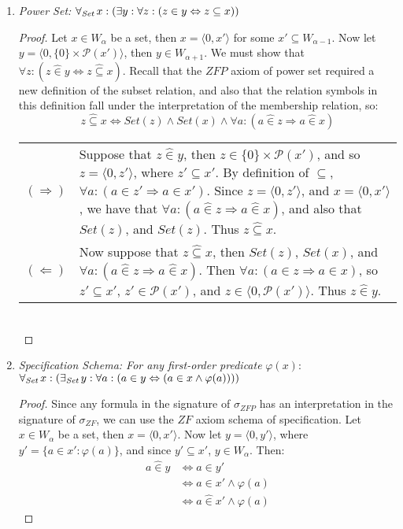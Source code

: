 \documentclass[11pt]{report}
\newcommand{\all}[1]{\forall_{\mathit{#1}}\hspace{0.5mm}}
\newcommand{\ex}[1]{\exists_{\mathit{#1}}\hspace{0.5mm}}
\newcommand{\pair}[2]{\langle #1,#2 \rangle}
\newcommand{\zin}{\mathrel{\widehat{\in}}}
\theoremstyle{definition}
\theoremstyle{theorem}
\theoremstyle{lemma}
\begin{document}
\begin{enumerate}[resume=axiomlist, label=\Roman*.]
\item \textit{Power Set:} $\all{Set}x:(\exists y:\forall z:(z\in y \Leftrightarrow z\subseteq x))$
\begin{proof}
  Let $x\in W_\alpha$ be a set, then $x=\pair{0}{x'}$ for some $x'\subseteq W_{\alpha-1}$.
  Now let $y=\pair{0}{\{0\}\times\mathcal{P}(x')}$, then $y\in W_{\alpha+1}$.
  We must show that $\forall z: (z\zin y \Leftrightarrow z\mathrel{\widehat\subseteq} x)$.
  Recall that the $\mathit{ZFP}$ axiom of power set required a new definition of the subset relation, and also that the relation symbols in this definition fall under the interpretation of the membership relation, so:
    $$z\mathrel{\widehat\subseteq} x \iff \mathit{Set}(z)\wedge\mathit{Set}(x)
                        \wedge \forall a: (a\zin z \Rightarrow a\zin x)$$
\begin{tabular}{p{7mm} p{10.6cm}}
  $(\Rightarrow)$\rule{0pt}{5mm} &
  Suppose that $z\zin y$, then $z\in\{0\}\times\mathcal{P}(x')$, and so $z=\pair{0}{z'}$, where $z'\subseteq x'$.
  By definition of $\subseteq$, $\forall a:(a\in z' \Rightarrow a\in x')$.
  Since $z=\pair{0}{z'}$, and $x=\pair{0}{x'}$, we have that $\forall a: (a\zin z \Rightarrow a\zin x)$, and also that $\mathit{Set}(z)$, and $\mathit{Set}(z)$. Thus $z\mathrel{\widehat\subseteq}x$.
  \\
  $(\Leftarrow)$ &\rule{0pt}{5mm}
  Now suppose that $z\mathrel{\widehat\subseteq}x$, then $\mathit{Set}(z)$, $\mathit{Set}(x)$, and $\forall a:(a\zin z\Rightarrow a\zin x)$.
  Then $\forall a:(a\in z\Rightarrow a\in x)$, so $z'\subseteq x'$, $z'\in \mathcal{P}(x')$, and $z\in\pair{0}{\mathcal{P}(x')}$.
  Thus $z\zin y$.
\end{tabular}\\
\end{proof}

\item \textit{Specification Schema: For any first-order predicate} $\varphi(x)$: \\
$\all{Set}x: (\ex{Set}y: \forall a:
                              (a\in y \Leftrightarrow (a\in x \wedge \varphi(a))))$
\begin{proof}
Since any formula in the signature of $\sigma_{\mathit{ZFP}}$ has an interpretation in the signature of $\sigma_{\mathit{ZF}}$, we can use the $\mathit{ZF}$ axiom schema of specification.
Let $x\in W_\alpha$ be a set, then $x=\pair{0}{x'}$.
Now let $y=\pair{0}{y'}$, where $y'=\{a\in x' : \varphi(a)\}$, and since $y'\subseteq x'$, $y\in W_\alpha$. Then:
\begin{align*}
  a\zin y &\iff a\in y'\\
          &\iff a\in x'\wedge \varphi(a)\\
          &\iff a\zin x' \wedge \varphi(a)
\end{align*}
\end{proof}
\end{enumerate}
\end{document}
